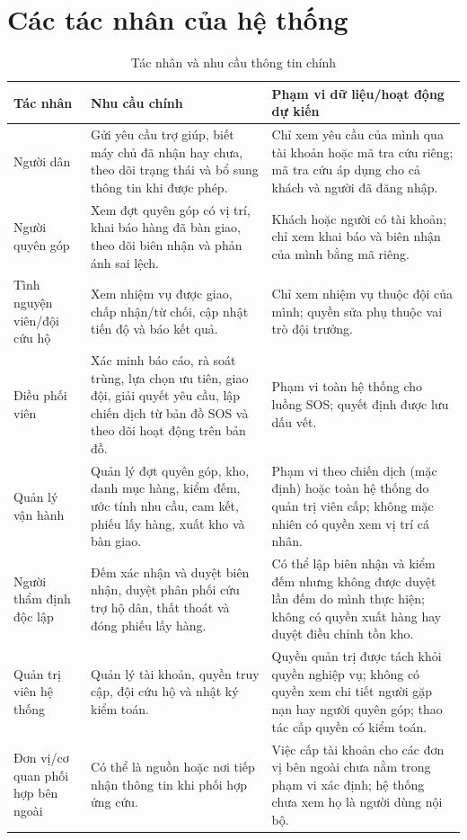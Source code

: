 \documentclass[12pt,a4paper,oneside]{report}
\begin{document}
\section{Các tác nhân của hệ thống}\label{sec:actors}
\begin{table}[htbp]
  \centering
  \caption{Tác nhân và nhu cầu thông tin chính}\label{tab:actors}
  \small
  \begin{tabularx}{\textwidth}{|L{3.1cm}|Y|Y|}
    \hline
    \centering\textbf{Tác nhân} & \centering\textbf{Nhu cầu chính} & \centering\arraybackslash\textbf{Phạm vi dữ liệu/hoạt động dự kiến} \\
    \hline
    Người dân & Gửi yêu cầu trợ giúp, biết máy chủ đã nhận hay chưa, theo dõi trạng thái và bổ sung thông tin khi được phép. & Chỉ xem yêu cầu của mình qua tài khoản hoặc mã tra cứu riêng; mã tra cứu áp dụng cho cả khách và người đã đăng nhập. \\
    \hline
    Người quyên góp & Xem đợt quyên góp có vị trí, khai báo hàng đã bàn giao, theo dõi biên nhận và phản ánh sai lệch. & Khách hoặc người có tài khoản; chỉ xem khai báo và biên nhận của mình bằng mã riêng. \\
    \hline
    Tình nguyện viên/đội cứu hộ & Xem nhiệm vụ được giao, chấp nhận/từ chối, cập nhật tiến độ và báo kết quả. & Chỉ xem nhiệm vụ thuộc đội của mình; quyền sửa phụ thuộc vai trò đội trưởng. \\
    \hline
    Điều phối viên & Xác minh báo cáo, rà soát trùng, lựa chọn ưu tiên, giao đội, giải quyết yêu cầu, lập chiến dịch từ bản đồ SOS và theo dõi hoạt động trên bản đồ. & Phạm vi toàn hệ thống cho luồng SOS; quyết định được lưu dấu vết. \\
    \hline
    Quản lý vận hành & Quản lý đợt quyên góp, kho, danh mục hàng, kiểm đếm, ước tính nhu cầu, cam kết, phiếu lấy hàng, xuất kho và bàn giao. & Phạm vi theo chiến dịch (mặc định) hoặc toàn hệ thống do quản trị viên cấp; không mặc nhiên có quyền xem vị trí cá nhân. \\
    \hline
    Người thẩm định độc lập & Đếm xác nhận và duyệt biên nhận, duyệt phân phối cứu trợ hộ dân, thất thoát và đóng phiếu lấy hàng. & Có thể lập biên nhận và kiểm đếm nhưng không được duyệt lần đếm do mình thực hiện; không có quyền xuất hàng hay duyệt điều chỉnh tồn kho. \\
    \hline
    Quản trị viên hệ thống & Quản lý tài khoản, quyền truy cập, đội cứu hộ và nhật ký kiểm toán. & Quyền quản trị được tách khỏi quyền nghiệp vụ; không có quyền xem chi tiết người gặp nạn hay người quyên góp; thao tác cấp quyền có kiểm toán. \\
    \hline
    Đơn vị/cơ quan phối hợp bên ngoài & Có thể là nguồn hoặc nơi tiếp nhận thông tin khi phối hợp ứng cứu. & Việc cấp tài khoản cho các đơn vị bên ngoài chưa nằm trong phạm vi xác định; hệ thống chưa xem họ là người dùng nội bộ. \\
    \hline
  \end{tabularx}
\end{table}
\end{document}
